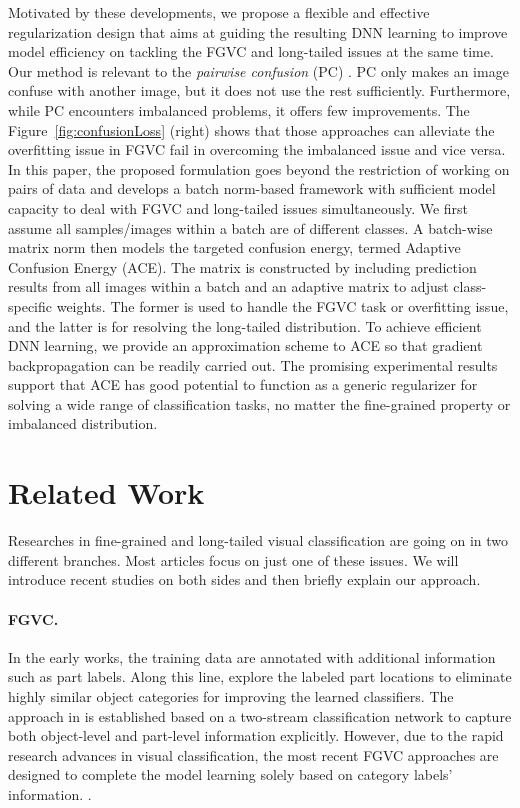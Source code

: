 \documentclass{article}
\begin{document}
Motivated by these developments, we propose a flexible and effective regularization design that aims at guiding the resulting DNN learning to improve model efficiency on tackling the FGVC and long-tailed issues at the same time. Our method is relevant to the {\it pairwise confusion} (PC) \cite{dubey2018pairwise}.  PC only makes an image confuse with another image, but it does not use the rest sufficiently. Furthermore, while PC encounters imbalanced problems, it offers few improvements. The Figure~\ref{fig:confusionLoss} (right) shows that those approaches can alleviate the overfitting issue in FGVC fail in overcoming the imbalanced issue and vice versa. In this paper, the proposed formulation goes beyond the restriction of working on pairs of data and develops a batch norm-based framework with sufficient model capacity to deal with  FGVC and long-tailed issues simultaneously. We first assume all samples/images within a batch are of different classes. A batch-wise matrix norm then models the targeted confusion energy, termed Adaptive Confusion Energy (ACE). The matrix is constructed by including prediction results from all images within a batch and an adaptive matrix to adjust class-specific weights. The former is used to handle the FGVC task or overfitting issue, and the latter is for resolving the long-tailed distribution. To achieve efficient DNN learning, we provide an approximation scheme to ACE so that gradient backpropagation can be readily carried out. The promising experimental results support that ACE has good potential to function as a generic regularizer for solving a wide range of classification tasks, no matter the fine-grained property or imbalanced distribution. 

\section{Related Work}
\label{sec:related}


Researches in fine-grained and long-tailed visual classification are going on in two different branches. Most articles focus on just one of these issues. We will introduce recent studies on both sides and then briefly explain our approach.
\vspace{-10pt}
\paragraph{FGVC.}
In the early works, the training data are annotated with additional information such as part labels. Along this line, \cite{berg2014birdsnap} explore the labeled part locations to eliminate highly similar object categories for improving the learned classifiers. The approach in \cite{huang2016part} is established based on a two-stream classification network to capture both object-level and part-level information explicitly. However, due to the rapid research advances in visual classification, the most recent FGVC approaches are designed to complete the model learning solely based on category labels' information.
\cite{sun2019fine,dubey2018pairwise,wang2018learning,li2018towards,yang2018learning,zheng2019looking,chen2019destruction, du2020fine}.
\vspace{-10pt}
\end{document}
